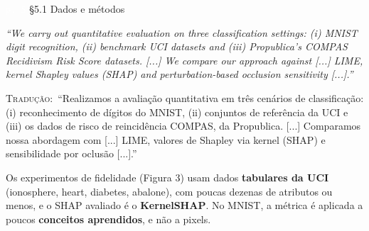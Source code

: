 \documentclass[11pt,a4paper]{article}
\newcommand{\pagechip}[1]{{\setlength{\fboxsep}{1.5pt}\colorbox{cAcc}{\textcolor{white}{\scriptsize\texttt{#1}}}}}
\newenvironment{origquote}{\par\itshape\small}{\par}
\newenvironment{tradquote}{\par\small\textsc{Tradução:}\ }{\par}
\newcommand{\explab}[1]{\par\smallskip{\small\color{cAcc}\textbf{\MakeUppercase{#1}}}\par}
\begin{document}
\begin{citacard}{\pagechip{p. 5} §5.1 Dados e métodos}
\begin{origquote}“We carry out quantitative evaluation on three classification settings: (i) MNIST digit recognition, (ii) benchmark UCI datasets and (iii) Propublica’s COMPAS Recidivism Risk Score datasets. [...] We compare our approach against [...] LIME, kernel Shapley values (SHAP) and perturbation-based occlusion sensitivity [...].”\end{origquote}
\begin{tradquote}“Realizamos a avaliação quantitativa em três cenários de classificação: (i) reconhecimento de dígitos do MNIST, (ii) conjuntos de referência da UCI e (iii) os dados de risco de reincidência COMPAS, da Propublica. [...] Comparamos nossa abordagem com [...] LIME, valores de Shapley via kernel (SHAP) e sensibilidade por oclusão [...].”\end{tradquote}
\explab{Explicação}
Os experimentos de fidelidade (Figura 3) usam dados \textbf{tabulares da UCI} (ionosphere, heart, diabetes, abalone), com poucas dezenas de atributos ou menos, e o SHAP avaliado é o \textbf{KernelSHAP}. No MNIST, a métrica é aplicada a poucos \textbf{conceitos aprendidos}, e não a pixels.
\end{citacard}
\end{document}
